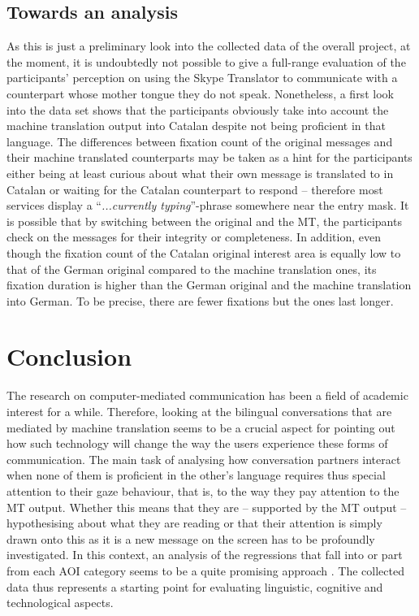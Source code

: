 \documentclass[output=paper]{langscibook}
\begin{document}

\subsection{Towards an analysis}
\label{subsec:towards_analysis}

As this is just a preliminary look into the collected data of the overall project, at the moment, it is undoubtedly not possible to give a full-range evaluation of the participants' perception on using the Skype Translator to communicate with a counterpart whose mother tongue they do not speak. Nonetheless, a first look into the data set shows that the participants obviously take into account the machine translation output into Catalan despite not being proficient in that language. The differences between fixation count of the original messages and their machine translated counterparts may be taken as a hint for the participants either being at least curious about what their own message is translated to in Catalan or waiting for the Catalan counterpart to respond -- therefore most services display a ``\textit{...currently typing}''-phrase somewhere near the entry mask.
It is possible that by switching between the original and the MT, the participants check on the messages for their integrity or completeness. In addition, even though the fixation count of the Catalan original interest area is equally low to that of the German original compared to the machine translation ones, its fixation duration is higher than the German original and the machine translation into German. To be precise, there are fewer fixations but the ones last longer.\largerpage[-1]
 




\section{Conclusion}
\label{sec:conclusion}

The research on computer-mediated communication has been a field of academic interest for a while. Therefore, looking at the bilingual conversations that are mediated by machine translation seems to be a crucial aspect for pointing out how such technology will change the way the users experience these forms of communication. The main task of analysing how conversation partners interact when none of them is proficient in the other's language requires thus special attention to their gaze behaviour, that is, to the way they pay attention to the MT output. Whether this means that they are -- supported by the MT output -- hypothesising about what they are reading or that their attention is simply drawn onto this as it is a new message on the screen has to be profoundly investigated. In this context, an analysis of the regressions that fall into or part from each AOI category seems to be a quite promising approach \citep[cf.][]{eskenazi_regressions_2017}. The collected data thus represents a starting point for evaluating linguistic, cognitive and technological aspects.    
\end{document}
